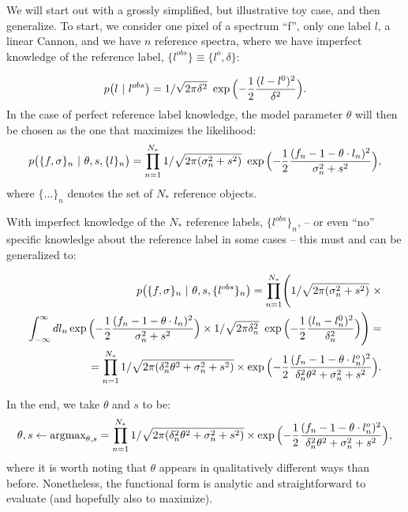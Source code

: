 \documentclass[12pt, letterpaper, preprint]{aastex}
\newcommand{\set}[1]{\{#1\}}
\begin{document}
We will start out with a grossly simplified, but illustrative toy case, and then generalize. 
To start, we consider one pixel of a spectrum ``f'', only one label $l$, a linear Cannon, and we have $n$ reference spectra, where we have imperfect knowledge of the reference label, $\{l^{obs}\}\equiv\{l^o,\delta\}$:

\begin{equation}
p\bigl ( l ~|~ l^{obs}\bigr ) = 1/\sqrt{2\pi \delta^2}\ 
\exp{\Bigl ( -\frac{1}{2}\frac{(l-l^0)^2}{\delta^2}\Bigr )}.
\end{equation}
%
In the case of perfect reference label knowledge, the model parameter $\theta$ will then be chosen as the one that maximizes the likelihood:
\begin{equation}
p\bigl ( \set{f,\sigma}_n~|~ \theta, s, \set{l}_n\bigr ) = 
\prod_{n=1}^{N_*}  1/\sqrt{2\pi (\sigma_n^2+s^2)}\ 
\exp{\Bigl ( -\frac{1}{2}\frac{(f_n-1-\theta \cdot l_n)^2}{\sigma_n^2+s^2}\Bigr )},
\end{equation}
where $\set{...}_n$ denotes the set of $N_*$ reference objects.

With imperfect knowledge of the $N_*$ reference labels, $\set{l^{obs}}_n$,  -- or even ``no'' specific knowledge about the reference label in some cases -- this must and can be generalized to:

\begin{equation}
\begin{aligned}
p\bigl ( \set{f,\sigma}_n~|~ \theta, s, \set{l^{obs}}_n\bigr )= \prod_{n=1}^{N_*} 
\Biggl ( 1/\sqrt{2\pi (\sigma_n^2+s^2)}\ \times \\
  \int_{-\infty}^\infty dl_n
\exp{\Bigl ( -\frac{1}{2}\frac{(f_n-1-\theta \cdot l_n)^2}{\sigma_n^2+s^2}\Bigr )}\times
1/\sqrt{2\pi \delta_n^2}\
\exp{\Bigl ( -\frac{1}{2}\frac{(l_n-l_n^0)^2}{\delta_n^2}\Bigr )}\Biggr )=\\
=\prod_{n=1}^{N_*} 1/\sqrt{2\pi (\delta_n^2\theta^2 + \sigma_n^2+s^2)}\times
\exp{\Bigl ( -\frac{1}{2}\frac{(f_n-1-\theta \cdot l_n^o)^2}{\delta_n^2\theta^2+\sigma_n^2+s^2}\Bigr )}.
\end{aligned}
\end{equation}

In the end, we take $\theta$ and $s$ to be:
\begin{eqnarray}
\theta,s \leftarrow \mbox{argmax}_{\theta, s} = 
\prod_{n=1}^{N_*} 1/\sqrt{2\pi (\delta_n^2\theta^2 + \sigma_n^2+s^2)}\times
\exp{\Bigl ( -\frac{1}{2}\frac{(f_n-1-\theta \cdot l_n^o)^2}{\delta_n^2\theta^2+\sigma_n^2+s^2}\Bigr )},
\end{eqnarray}
where it is worth noting that $\theta$ appears in qualitatively different ways than before. Nonetheless, the functional form is analytic and straightforward to evaluate (and hopefully also to maximize).
\end{document}
